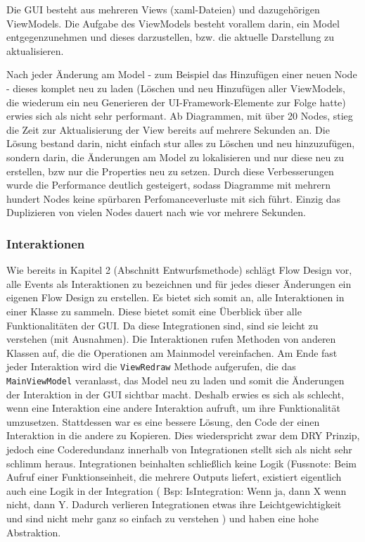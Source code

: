 \documentclass[11pt]{article}
\begin{document}
Die GUI besteht aus mehreren Views (xaml-Dateien) und dazugehörigen ViewModels.
Die Aufgabe des ViewModels besteht vorallem darin, ein Model entgegenzunehmen und dieses
darzustellen, bzw. die aktuelle Darstellung zu aktualisieren.

Nach jeder Änderung am Model - zum Beispiel das Hinzufügen einer neuen
Node -  dieses komplet neu zu laden (Löschen und neu Hinzufügen aller
ViewModels, die wiederum ein neu Generieren der UI-Framework-Elemente zur
Folge hatte) erwies sich als nicht sehr performant. 
Ab Diagrammen, mit über 20 Nodes, stieg die Zeit zur Aktualisierung der View
bereits auf mehrere Sekunden an.
Die Lösung bestand darin, nicht einfach stur alles zu Löschen und neu
hinzuzufügen, sondern darin, die Änderungen am Model zu lokalisieren und nur
diese neu zu erstellen, bzw nur die Properties neu zu setzen. Durch
diese Verbesserungen wurde die Performance deutlich gesteigert, sodass
Diagramme mit mehrern hundert Nodes keine spürbaren Perfomanceverluste mit
sich führt. Einzig das Duplizieren von vielen Nodes dauert nach wie vor
mehrere Sekunden. 

\subsubsection{Interaktionen}
\label{sec:orgheadline26}
Wie bereits in Kapitel 2 (Abschnitt Entwurfsmethode) schlägt Flow Design
vor, alle Events als Interaktionen zu bezeichnen und für jedes dieser
Änderungen ein eigenen Flow Design zu erstellen. 
Es bietet sich somit an, alle Interaktionen in einer Klasse zu sammeln.
Diese bietet somit eine Überblick über alle Funktionalitäten der GUI.
Da diese Integrationen sind, sind sie leicht zu verstehen (mit Ausnahmen). Die
Interaktionen rufen Methoden von anderen Klassen auf, die die Operationen am
Mainmodel vereinfachen. Am Ende fast jeder Interaktion wird die \texttt{ViewRedraw}
Methode aufgerufen, die das \texttt{MainViewModel} veranlasst, das Model neu zu
laden und somit die Änderungen der Interaktion in der GUI sichtbar macht.
Deshalb erwies es sich als schlecht, wenn eine Interaktion eine andere
Interaktion aufruft, um ihre Funktionalität umzusetzen. 
Stattdessen war es eine bessere Lösung, den Code der einen Interaktion in
die andere zu Kopieren. Dies wiederspricht zwar dem DRY Prinzip, jedoch eine
Coderedundanz innerhalb von Integrationen stellt sich als nicht sehr schlimm
heraus. Integrationen beinhalten schließlich keine Logik (Fussnote: Beim
Aufruf einer Funktionseinheit, die mehrere Outputs liefert, existiert
eigentlich auch eine Logik in der Integration ( Bsp: IsIntegration: Wenn ja,
dann X wenn nicht, dann Y. Dadurch verlieren Integrationen etwas ihre
Leichtgewichtigkeit und sind nicht mehr ganz so einfach zu verstehen ) und haben eine hohe
Abstraktion.
\end{document}
